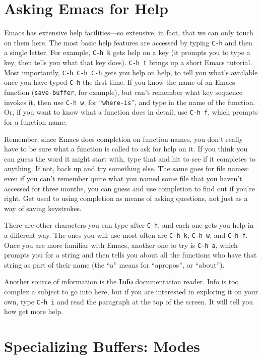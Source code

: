 \section{Asking Emacs for Help}

        Emacs has extensive help facilities---so extensive, in fact,
that we can only touch on them here.  The most basic help features are
accessed by typing {\tt C-h} and then a single letter.  For example,
{\tt C-h~k} gets help on a key (it prompts you to type a key, then
tells you what that key does).  {\tt C-h~t} brings up a short Emacs
tutorial.  Most importantly, {\tt C-h~C-h~C-h} gets you help on help,
to tell you what's available once you have typed {\tt C-h} the first
time.  If you know the name of an Emacs function ({\tt save-buffer},
for example), but can't remember what key sequence invokes it, then
use {\tt C-h~w}, for ``{\tt where-is}'', and type in the name of the
function.  Or, if you want to know what a function does in detail, use
{\tt C-h~f}, which prompts for a function name.

        Remember, since Emacs does completion on function names, you
don't really have to be sure what a function is called to ask for help
on it.  If you think you can guess the word it might start with, type
that and hit  to see if it completes to anything.  If not,
back up and try something else.  The same goes for file names: even if
you can't remember quite what you named some file that you haven't
accessed for three months, you can guess and use completion to find
out if you're right.  Get used to using completion as means of asking
questions, not just as a way of saving keystrokes.

        There are other characters you can type after {\tt C-h}, and
each one gets you help in a different way.  The ones you will use most
often are {\tt C-h~k}, {\tt C-h~w}, and {\tt C-h~f}.  Once you are
more familiar with Emacs, another one to try is {\tt C-h~a}, which
prompts you for a string and then tells you about all the functions
who have that string as part of their name (the ``a'' means for
``apropos'', or ``about'').

        Another source of information is the {\bf Info} documentation
reader.  Info is too complex a subject to go into here, but if you are
interested in exploring it on your own, type {\tt C-h~i} and read the
paragraph at the top of the screen.  It will tell you how get more
help.

\section{Specializing Buffers: Modes}\label{emacs-mail-mode}

